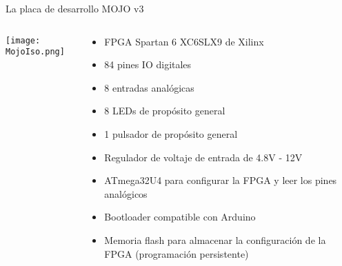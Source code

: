 \begin{frame}{La placa de desarrollo MOJO v3}
	\begin{columns}
		\begin{column}{.43\textwidth}
			\texttt{[image: MojoIso.png]}
		\end{column}
		\begin{column}{.55\textwidth}
			\begin{itemize}
				\item FPGA Spartan 6 XC6SLX9 de Xilinx
				\item 84 pines IO digitales
				\item 8 entradas analógicas
				\item 8 LEDs de propósito general
				\item 1 pulsador de propósito general
				\item Regulador de voltaje de entrada de 4.8V - 12V
				\item ATmega32U4 para configurar la FPGA y leer los pines analógicos
				\item Bootloader compatible con Arduino
				\item Memoria flash para almacenar la configuración de la FPGA (programación persistente)
			\end{itemize}
		\end{column}
	\end{columns}
\end{frame}

